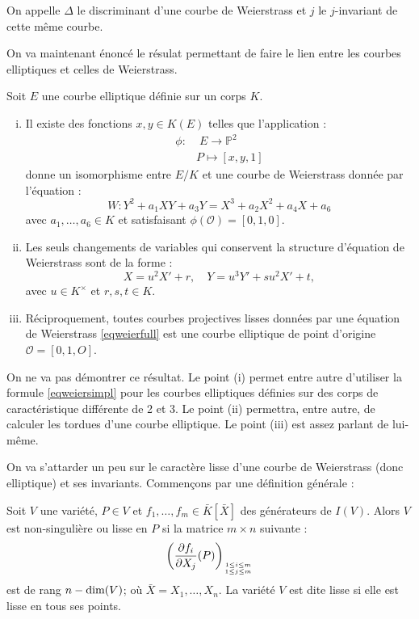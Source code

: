 \documentclass[a4paper]{article} %
\numberwithin{section}{part}
\numberwithin{equation}{section}
\newcommand\EO{\mathcal{O}}
\newcommand\PP[1]{\mathbb{P}^{#1}}
\begin{document}
\begin{defn}
On appelle $\Delta$ le discriminant d'une courbe de Weierstrass et $j$ le
$j$-invariant de cette même courbe.
\end{defn}

On va maintenant énoncé le résulat permettant de faire le lien entre les courbes
elliptiques et celles de Weierstrass.

\begin{prop}
Soit $E$ une courbe elliptique définie sur un corps $K$.
\begin{enumerate}[(i)]
\item Il existe des fonctions $x, y\in K(E)$ telles que l'application :
\begin{align*}
\phi :&\;E \longrightarrow \PP{2}\\
&P \longmapsto [x,y,1]
\end{align*}
donne un isomorphisme entre $E/K$ et une courbe de Weierstrass donnée par
l'équation :
\[W : Y^2 + a_1XY + a_3Y = X^3 + a_2X^2 + a_4X + a_6\]
avec $a_1,\dots,a_6\in K$ et satisfaisant $\phi(\EO) = [0, 1, 0]$.

\item Les seuls changements de variables qui conservent la structure d'équation
de Weierstrass sont de la forme :
\[X = u^2X' + r, \quad Y = u^3Y' + su^2X' + t,\]
avec $u\in K^{\times}$ et $r,s,t\in K$.

\item Réciproquement, toutes courbes projectives lisses données par une équation
de Weierstrass \ref{eqweierfull} est une courbe elliptique de point d'origine
$\EO = [0, 1, O]$.
\end{enumerate}
\end{prop}

On ne va pas démontrer ce résultat. Le point (i) permet entre autre d'utiliser
la formule \ref{eqweiersimpl} pour les courbes elliptiques définies sur des
corps de caractéristique différente de 2 et 3. Le point (ii) permettra, entre
autre, de calculer les tordues d'une courbe elliptique. Le point (iii) est assez
parlant de lui-même.\par
On va s'attarder un peu sur le caractère lisse d'une courbe de Weierstrass (donc
elliptique) et ses invariants. Commençons par une définition générale :

\begin{defn}
Soit $V$ une variété, $P\in V$ et $f_1,\dots,f_m \in\bar{K}[\bar{X}]$ des 
générateurs de $I(V)$. Alors $V$ est non-singulière ou lisse en $P$ si la 
matrice $m \times n$ suivante :
\[\left(\frac{\partial f_i}{\partial X_j}(P)\right)_{1\leq i \leq m\atop 1\leq j
\leq m}\]
est de rang $n - \textup{dim}(V)$; où $\bar{X} = X_1,\dots,X_n$. La variété $V$
est dite lisse si elle est lisse en tous ses points.
\end{defn}
\end{document}
